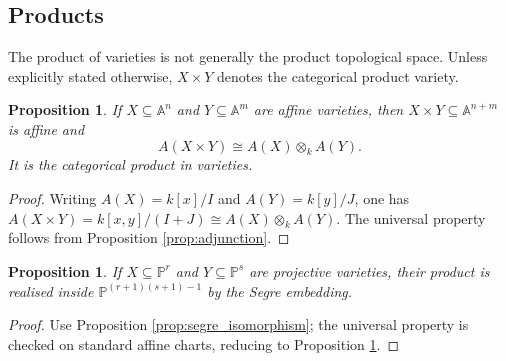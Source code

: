 \documentclass[12pt]{article}
\theoremstyle{plain}
\newtheorem{proposition}[thm]{Proposition}
\theoremstyle{definition}
\newcommand{\bb}[1]{\mathbb{#1}}
\begin{document}
\subsection{Products}
The product of varieties is not generally the product topological space. Unless explicitly stated otherwise, $X\times Y$ denotes the categorical product variety.
\begin{proposition}\label{prop:prod_affine_variety}
If $X\subseteq\bb A^n$ and $Y\subseteq\bb A^m$ are affine varieties, then $X\times Y\subseteq\bb A^{n+m}$ is affine and
\[
A(X\times Y)\cong A(X)\otimes_kA(Y).
\]
It is the categorical product in varieties.
\end{proposition}
\begin{proof}
Writing $A(X)=k[x]/I$ and $A(Y)=k[y]/J$, one has $A(X\times Y)=k[x,y]/(I+J)\cong A(X)\otimes_kA(Y)$. The universal property follows from Proposition \ref{prop:adjunction}.
\end{proof}
\begin{proposition}\label{prop:prod_projective_variety}
If $X\subseteq\bb P^r$ and $Y\subseteq\bb P^s$ are projective varieties, their product is realised inside $\bb P^{(r+1)(s+1)-1}$ by the Segre embedding.
\end{proposition}
\begin{proof}
Use Proposition \ref{prop:segre_isomorphism}; the universal property is checked on standard affine charts, reducing to Proposition \ref{prop:prod_affine_variety}.
\end{proof}
\end{document}
